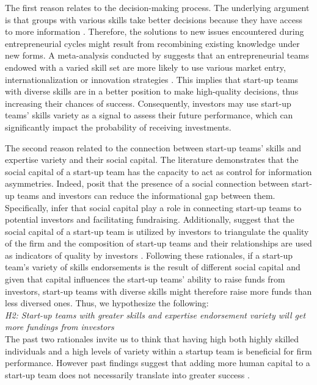 \documentclass[12pt]{article}
\begin{document}
The first reason relates to the decision-making process. The underlying argument is that groups with various skills take better decisions because they have access to more information \citep{hong2001problem}. Therefore, the solutions to new issues encountered during entrepreneurial cycles might result from recombining existing knowledge under new forms. A meta-analysis conducted by \citet{jin2017entrepreneurial} suggests that an entrepreneurial teams endowed with a varied skill set are more likely to use various market entry, internationalization or innovation strategies \citep{boeker1989strategic}. This implies that start-up teams with diverse skills are in a better position to make high-quality decisions, thus increasing their chances of success. Consequently, investors may use start-up teams' skills variety as a signal to assess their future performance, which can significantly impact the probability of receiving investments.

The second reason related to the connection between start-up teams' skills and expertise variety and their social capital. The literature demonstrates that the social capital of a start-up team has the capacity to act as control for information asymmetries. Indeed, \citet{huang2017resources, shane2002organizational} posit that the presence of a social connection between start-up teams and investors can reduce the informational gap between them. Specifically, \citet{shane2002network} infer that social capital play a role in connecting start-up teams to potential investors and facilitating fundraising. Additionally, \citet{hoenig2015quality} suggest that the social capital of a start-up team is utilized by investors to triangulate the quality of the firm and the composition of start-up teams and their relationships are used as indicators of quality by investors \citep{plummer2016better, semrau2014exactly}. Following these rationales, if a start-up team's variety of skills endorsements is the result of different social capital and given that capital influences the start-up teams' ability to raise funds from investors, start-up teams with diverse skills might therefore raise more funds than less diversed ones. Thus, we hypothesize the following: \\

\noindent \textit{H2: Start-up teams with greater skills and expertise endorsement variety will get more fundings from investors} \\

The past two rationales invite us to think that having high both highly skilled individuals and a high levels of variety within a startup team is beneficial for firm performance. However past findings suggest that adding more human capital to a start-up team does not necessarily translate into greater success \citep{pierce2013too}.
\end{document}
